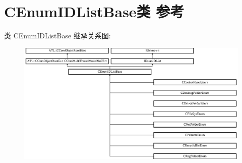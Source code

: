 \hypertarget{class_c_enum_i_d_list_base}{}\section{C\+Enum\+I\+D\+List\+Base类 参考}
\label{class_c_enum_i_d_list_base}
类 C\+Enum\+I\+D\+List\+Base 继承关系图\+:\begin{figure}[H]
\begin{center}
\leavevmode
\includegraphics[height=5.833333cm]{class_c_enum_i_d_list_base}
\end{center}
\end{figure}
